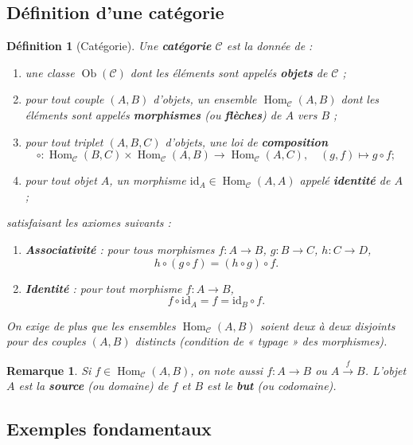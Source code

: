 \documentclass[a4paper,12pt]{book}
\DeclareMathOperator{\Hom}{Hom}
\DeclareMathOperator{\Ob}{Ob}
\newcommand{\id}{\mathrm{id}}
\newtheorem{definition}[theoreme]{Définition}
\newtheorem*{remarque}{Remarque}
\begin{document}
\subsection{Définition d'une catégorie}

\begin{definition}[Catégorie]\label{def:categorie}
Une \textbf{catégorie} $\mathcal{C}$ est la donnée de :
\begin{enumerate}[label=(\roman*)]
  \item une classe $\Ob(\mathcal{C})$ dont les éléments sont appelés \textbf{objets} de $\mathcal{C}$ ;
  \item pour tout couple $(A, B)$ d'objets, un ensemble $\Hom_{\mathcal{C}}(A, B)$ dont les éléments sont appelés \textbf{morphismes} (ou \textbf{flèches}) de $A$ vers $B$ ;
  \item pour tout triplet $(A, B, C)$ d'objets, une loi de \textbf{composition}
  \[
    \circ : \Hom_{\mathcal{C}}(B, C) \times \Hom_{\mathcal{C}}(A, B) \longrightarrow \Hom_{\mathcal{C}}(A, C), \quad (g, f) \longmapsto g \circ f ;
  \]
  \item pour tout objet $A$, un morphisme $\id_A \in \Hom_{\mathcal{C}}(A, A)$ appelé \textbf{identité} de $A$ ;
\end{enumerate}
satisfaisant les axiomes suivants :
\begin{enumerate}[label=(C\arabic*)]
  \item \textbf{Associativité} : pour tous morphismes $f : A \to B$, $g : B \to C$, $h : C \to D$,
  \[ h \circ (g \circ f) = (h \circ g) \circ f. \]
  \item \textbf{Identité} : pour tout morphisme $f : A \to B$,
  \[ f \circ \id_A = f = \id_B \circ f. \]
\end{enumerate}
On exige de plus que les ensembles $\Hom_{\mathcal{C}}(A, B)$ soient deux à deux disjoints pour des couples $(A,B)$ distincts (condition de « typage » des morphismes).
\end{definition}

\begin{remarque}
Si $f \in \Hom_{\mathcal{C}}(A,B)$, on note aussi $f : A \to B$ ou $A \xrightarrow{f} B$. L'objet $A$ est la \textbf{source} (ou domaine) de $f$ et $B$ est le \textbf{but} (ou codomaine).
\end{remarque}

\subsection{Exemples fondamentaux}
\end{document}
